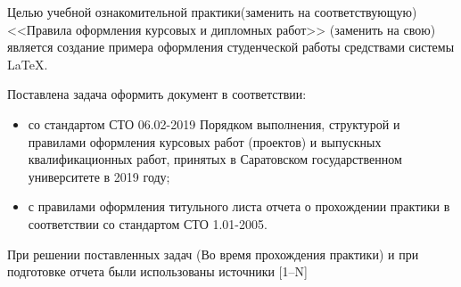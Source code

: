 \documentclass[bachelor, och, pract3]{SCWorks}
\begin{document}


\tableofcontents





\intro

Целью учебной ознакомительной практики(заменить на соответствующую) <<Правила оформления курсовых и дипломных работ>> (заменить на свою) является создание примера оформления студенческой работы средствами системы \LaTeX.

Поставлена задача оформить документ в соответствии:
\begin{itemize}
    \item со стандартом СТО 06.02-2019 Порядком выполнения, структурой и правилами оформления курсовых работ (проектов)
    и выпускных квалификационных работ, принятых в Саратовском государственном университете в 2019 году;
    \item с правилами оформления титульного листа отчета о прохождении практики в соответствии со стандартом СТО 1.01-2005.
\end{itemize}

При решении поставленных задач (Во время прохождения практики) и при подготовке отчета были использованы источники [1--N]
\end{document}
